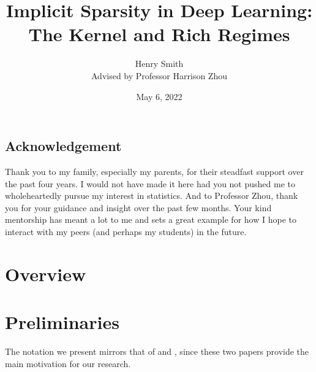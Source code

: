 \documentclass{article}
\title{\textbf{Implicit Sparsity in Deep Learning:\\The Kernel and Rich Regimes}}
\author[]{Henry Smith\\
Advised by Professor Harrison Zhou}
\affil[]{\normalsize Department of Statistics \& Data Science\\Yale University}
\date{May 6, 2022}
\begin{document}
\maketitle

\begin{abstract}

\end{abstract}

\pagebreak

\vspace*{\fill}

\begin{centering}
\section*{Acknowledgement}
Thank you to my family, especially my parents, for their steadfast support over the past four years. I would not have made it here had you not pushed me to wholeheartedly pursue my interest in statistics. And to Professor Zhou, thank you for your guidance and insight over the past few months. Your kind mentorship has meant a lot to me and sets a great example for how I hope to interact with my peers (and perhaps my students) in the future. 
\end{centering}

\vspace*{\fill}

\pagebreak

\vspace*{\fill}

\begin{centering}
\tableofcontents
\end{centering}

\vspace*{\fill}

\pagebreak

\section{Overview}

\section{Preliminaries}\label{preliminaries}

The notation we present mirrors that of \cite{chizat2018lazy} and \cite{woodworth2020kernel}, since these two papers provide the main motivation for our research.
\end{document}
